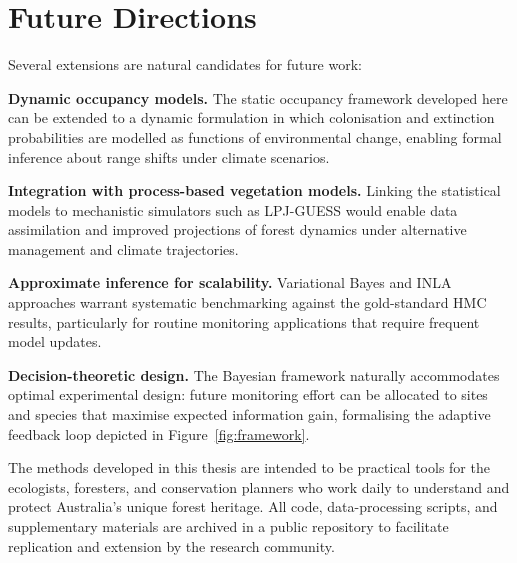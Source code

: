 \section{Future Directions}

Several extensions are natural candidates for future work:

\textbf{Dynamic occupancy models.} The static occupancy framework developed
here can be extended to a dynamic formulation in which colonisation and
extinction probabilities are modelled as functions of environmental change,
enabling formal inference about range shifts under climate scenarios.

\textbf{Integration with process-based vegetation models.} Linking the
statistical models to mechanistic simulators such as LPJ-GUESS would enable
data assimilation and improved projections of forest dynamics under alternative
management and climate trajectories.

\textbf{Approximate inference for scalability.} Variational Bayes and INLA
approaches warrant systematic benchmarking against the gold-standard HMC
results, particularly for routine monitoring applications that require
frequent model updates.

\textbf{Decision-theoretic design.} The Bayesian framework naturally
accommodates optimal experimental design: future monitoring effort can be
allocated to sites and species that maximise expected information gain,
formalising the adaptive feedback loop depicted in
Figure~\ref{fig:framework}.

The methods developed in this thesis are intended to be practical tools for the
ecologists, foresters, and conservation planners who work daily to understand
and protect Australia's unique forest heritage. All code, data-processing
scripts, and supplementary materials are archived in a public repository to
facilitate replication and extension by the research community.

\backmatter

